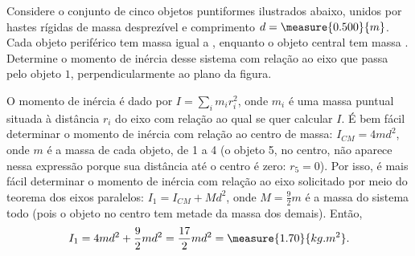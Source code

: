\begin{question}
	Considere o conjunto de cinco objetos puntiformes ilustrados abaixo, unidos por hastes rígidas de massa desprezível e comprimento $d = \measure{0.500}{m}$.
	Cada objeto periférico tem massa igual a , enquanto o objeto central tem massa .
	Determine o momento de inércia desse sistema com relação ao eixo que passa pelo objeto $1$, perpendicularmente ao plano da figura.


	\begin{answer}
	\end{answer}

	\begin{solution}
		O momento de inércia é dado por $I = \sum_i m_i r_i^2$, onde $m_i$ é uma massa puntual situada à distância $r_i$ do eixo com relação ao qual se quer calcular $I$.
		É bem fácil determinar o momento de inércia com relação ao centro de massa: $I_{CM} = 4md^2$, onde $m$ é a massa de cada objeto, de 1 a 4 (o objeto 5, no centro, não aparece nessa expressão porque sua distância até o centro é zero: $r_5 = 0$).
		Por isso, é mais fácil determinar o momento de inércia com relação ao eixo solicitado por meio do teorema dos eixos paralelos: $I_1 = I_{CM} + Md^2$, onde $M = \frac{9}{2}m$ é a massa do sistema todo (pois o objeto no centro tem metade da massa dos demais).
		Então,
		\begin{equation*}
			I_1 = 4md^2 + \frac{9}{2}md^2 = \frac{17}{2}md^2 = \measure{1.70}{kg.m^2}.
		\end{equation*}
	\end{solution}
\end{question}